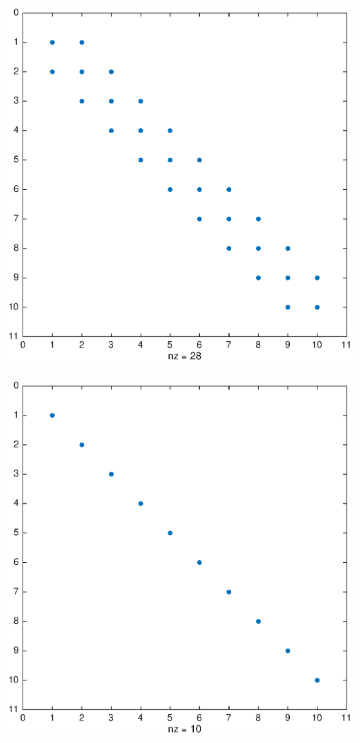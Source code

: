  





\begin{figure}[h!]
  \begin{subfigure}[b]{0.3\linewidth}
    \centering
    \includegraphics[scale=0.2]{s1/matlab/A} 
  \end{subfigure}
  \begin{subfigure}[b]{0.3\linewidth}
    \centering
    \includegraphics[scale=0.2]{s1/matlab/D} 

\end{subfigure}
\end{figure}
